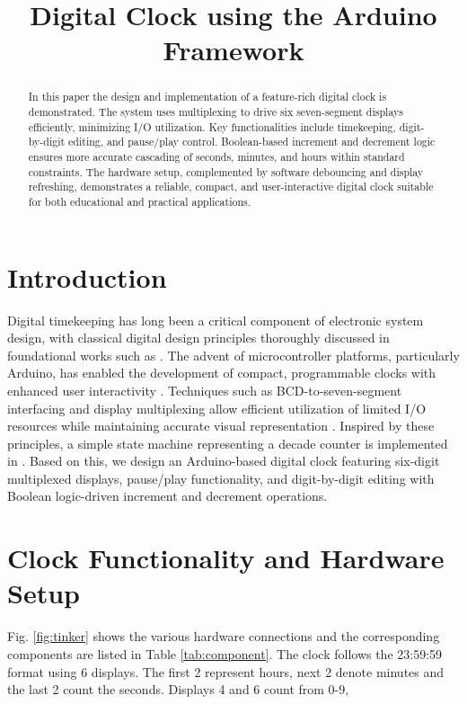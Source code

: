 \documentclass[conference]{IEEEtran}
\title{Digital Clock using the Arduino Framework}
\author{
    \IEEEauthorblockN{Dhawal Saini and G. V. V. Sharma}
    \IEEEauthorblockA{Department of Electrical Engineering\\
    Indian Institute of Technology Hyderabad\\
    Email: gadepall@ee.iith.ac.in}
}
\begin{document}
\maketitle

\begin{abstract}
In this paper the design and implementation of a feature-rich digital clock is demonstrated. The system uses multiplexing to drive six seven-segment displays efficiently, minimizing I/O utilization. Key functionalities include timekeeping, digit-by-digit editing, and pause/play control. Boolean-based increment and decrement logic ensures more accurate cascading of seconds, minutes, and hours within standard constraints. The hardware setup, complemented by software debouncing and display refreshing, demonstrates a reliable, compact, and user-interactive digital clock suitable for both educational and practical applications.
\end{abstract}
\section{Introduction}
Digital timekeeping has long been a critical component of electronic system design, with classical digital design principles thoroughly discussed in foundational works such as \cite{mano2013digital, malvino2017digital, patterson2014computer}. The advent of microcontroller platforms, particularly Arduino, has enabled the development of compact, programmable clocks with enhanced user interactivity \cite{arduino_reference}. Techniques such as BCD-to-seven-segment interfacing and display multiplexing allow efficient utilization of limited I/O resources while maintaining accurate visual representation \cite{ti7447datasheet}. Inspired by these principles, a simple state machine representing a decade counter is  implemented in \cite{ddta}.  Based 
on this, 
we design an Arduino-based digital clock featuring six-digit multiplexed displays, pause/play functionality, and digit-by-digit editing with Boolean logic-driven increment and decrement operations.

%
%
\section{Clock Functionality and Hardware Setup}
Fig. \ref{fig:tinker}  shows the various hardware connections and the corresponding components are listed in 
Table \ref{tab:component}.  The clock follows the 23:59:59 format using 6 displays.  The first 2 represent hours, next 2 denote minutes and the last 2 count the seconds.  Displays 4 and 6 count from 0-9, 
\end{document}
